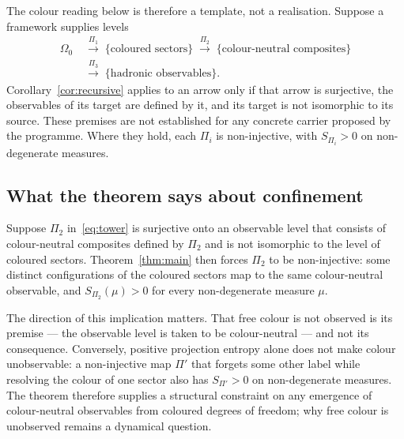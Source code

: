 \documentclass[12pt,a4paper]{article}
\begin{document}
    The colour reading below is therefore a template, not a realisation.
    Suppose a framework supplies levels
    \begin{equation}
      \begin{aligned}
        \Omega_0
        &\;\xrightarrow{\Pi_1}\;
        \{\text{coloured sectors}\}
        \;\xrightarrow{\Pi_2}\;
        \{\text{colour-neutral composites}\} \\
        &\;\xrightarrow{\Pi_3}\;
        \{\text{hadronic observables}\}.
      \end{aligned}
      \label{eq:tower}
    \end{equation}
    Corollary~\ref{cor:recursive} applies to an arrow only if that arrow is surjective, the observables of
    its target are defined by it, and its target is not isomorphic to its source.
    These premises are not established for any concrete carrier proposed by the programme.
    Where they hold, each $\Pi_i$ is non-injective, with $S_{\Pi_i} > 0$ on non-degenerate measures.

  \subsection*{What the theorem says about confinement}

    Suppose $\Pi_2$ in~\eqref{eq:tower} is surjective onto an observable level that consists of
    colour-neutral composites defined by $\Pi_2$ and is not isomorphic to the level of coloured sectors.
    Theorem~\ref{thm:main} then forces $\Pi_2$ to be non-injective: some distinct configurations of the
    coloured sectors map to the same colour-neutral observable, and $S_{\Pi_2}(\mu) > 0$ for every
    non-degenerate measure $\mu$.

    The direction of this implication matters.
    That free colour is not observed is its premise --- the observable level is taken to be colour-neutral
    --- and not its consequence.
    Conversely, positive projection entropy alone does not make colour unobservable: a non-injective map
    $\Pi'$ that forgets some other label while resolving the colour of one sector also has $S_{\Pi'} > 0$
    on non-degenerate measures.
    The theorem therefore supplies a structural constraint on any emergence of colour-neutral observables
    from coloured degrees of freedom; why free colour is unobserved remains a dynamical question.
\end{document}

